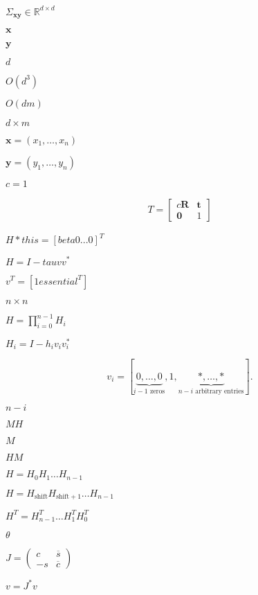 \documentclass{article}
\begin{document}
$ \Sigma_{\mathbf{x}\mathbf{y}} \in \mathbb{R}^{d \times d} $
\pagebreak

$ \mathbf{x} $
\pagebreak

$ \mathbf{y} $
\pagebreak

$d$
\pagebreak

$O(d^3)$
\pagebreak

$O(dm)$
\pagebreak

$d \times m$
\pagebreak

$ \mathbf{x} = \left( x_1, \hdots, x_n \right) $
\pagebreak

$ \mathbf{y} = \left( y_1, \hdots, y_n \right) $
\pagebreak

$ c=1 $
\pagebreak

\begin{align*} T = \begin{bmatrix} c\mathbf{R} & \mathbf{t} \\ \mathbf{0} & 1 \end{bmatrix} \end{align*}
\pagebreak

$ H *this = [ beta 0 ... 0]^T $
\pagebreak

$ H = I - tau v v^*$
\pagebreak

$ v^T = [1 essential^T] $
\pagebreak

$ n \times n $
\pagebreak

$ H = \prod_{i=0}^{n-1} H_i $
\pagebreak

$ H_i = I - h_i v_i v_i^* $
\pagebreak

\[ v_i = [\underbrace{0, \ldots, 0}_{i-1\mbox{ zeros}}, 1, \underbrace{*, \ldots,*}_{n-i\mbox{ arbitrary entries}} ]. \]
\pagebreak

$ n-i $
\pagebreak

$ MH $
\pagebreak

$ M $
\pagebreak

$ HM $
\pagebreak

$ H = H_0 H_1 \ldots H_{n-1} $
\pagebreak

$ H = H_{\mathrm{shift}} H_{\mathrm{shift}+1} \ldots H_{n-1} $
\pagebreak

$ H^T = H_{n-1}^T \ldots H_1^T H_0^T $
\pagebreak

$ \theta $
\pagebreak

$ J = \left ( \begin{array}{cc} c & \overline s \\ -s & \overline c \end{array} \right ) $
\pagebreak

$ v = J^* v $
\pagebreak
\end{document}

